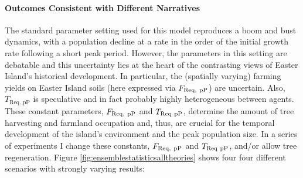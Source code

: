 \paragraph{Outcomes Consistent with Different Narratives}
The standard parameter setting used for this model reproduces a boom and bust dynamics, with a population decline at a rate in the order of the initial growth rate following a short peak period.
However, the parameters in this setting are debatable and this uncertainty lies at the heart of the contrasting views of Easter Island's historical development.
In particular, the (spatially varying) farming yields on Easter Island soils (here expressed via $F_{\rm Req, \ pP}$) are uncertain.
Also, $T_\text{Req, pP}$ is speculative and in fact probably highly heterogeneous between agents.
These constant parameters, $F_{\rm Req, \ pP}$ and $T_{\rm Req\ pP}$, determine the amount of tree harvesting and farmland occupation and, thus, are crucial for the temporal development of the island's environment and the peak population size. 
In a series of experiments I change these constants, $F_{\rm Req, \ pP}$ and $T_{\rm Req\ pP}$, and/or allow tree regeneration.
Figure \ref{fig:ensemblestatisticsalltheories} shows four four different scenarios with strongly varying results:
